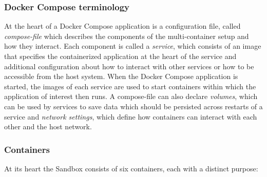 \documentclass[11pt, a4paper, oneside, parskip=full-]{scrartcl}
\begin{document}
\subsubsection*{Docker Compose terminology}

At the heart of a Docker Compose application is a configuration file, called
\emph{compose-file} which describes the components of the multi-container setup
and how they interact. Each component is called a \emph{service}, which consists
of an image that specifies the containerized application at the heart of the
service and additional configuration about how to interact with other services
or how to be accessible from the host system. When the Docker Compose
application is started, the images of each service are used to start containers
within which the application of interest then runs. A compose-file can also
declare \emph{volumes}, which can be used by services to save data which should
be persisted across restarts of a service and \emph{network settings}, which
define how containers can interact with each other and the host network.

\subsubsection*{Containers}
At its heart the Sandbox consists of six containers, each with a distinct
purpose:
\end{document}
